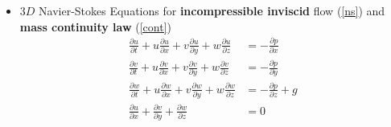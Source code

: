 \begin{frame}
\vspace{-3mm}
\begin{itemize}
\item<2-> $3D$ Navier-Stokes Equations for \textbf{incompressible inviscid} flow (\ref{ns}) and \textbf{mass continuity law} (\ref{cont})
\vspace{0.5cm}
\begin{align}
\frac{\partial u}{\partial t} + u\frac{\partial u}{\partial x} + v\frac{\partial u}{\partial y} + w\frac{\partial u}{\partial z} &= - \frac{\partial p}{\partial x} \nonumber \\[0.8cm]
\frac{\partial v}{\partial t} + u\frac{\partial v}{\partial x} + v\frac{\partial v}{\partial y} + w\frac{\partial v}{\partial z}&= - \frac{\partial p}{\partial y} \label{ns} \\[0.8cm]
\frac{\partial w}{\partial t} + u\frac{\partial w}{\partial x} + v\frac{\partial w}{\partial y} + w\frac{\partial w}{\partial z} &= - \frac{\partial p}{\partial z} + g \nonumber\\[1.5cm]
\frac{\partial u}{\partial x} + \frac{\partial v}{\partial y} + \frac{\partial w}{\partial z} &= 0 \label{cont}
\end{align}
\end{itemize}
\end{frame}
\clearpage



